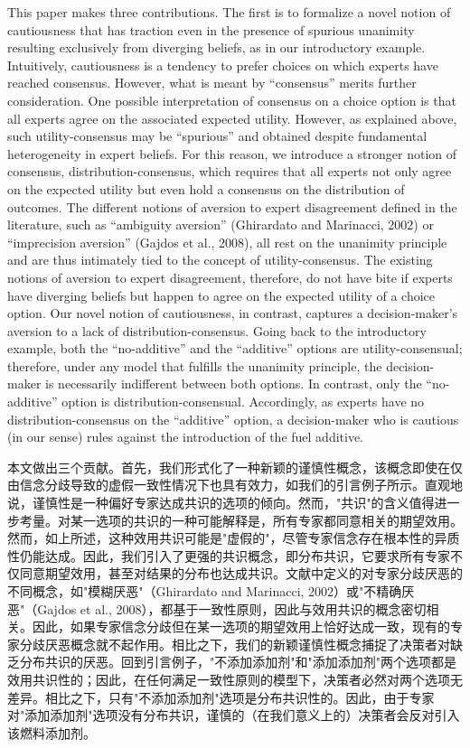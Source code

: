 \documentclass[12pt,a4paper]{article}
\newenvironment{original}
  {\par\noindent\ignorespaces}
  {\par}
\newenvironment{translation}
  {\par\noindent{\color{transblue}\ignorespaces}}
  {\par\medskip}
\begin{document}
\begin{original}
This paper makes three contributions. The first is to formalize a novel notion of cautiousness that has traction even in the presence of spurious unanimity resulting exclusively from diverging beliefs, as in our introductory example. Intuitively, cautiousness is a tendency to prefer choices on which experts have reached consensus. However, what is meant by ``consensus'' merits further consideration. One possible interpretation of consensus on a choice option is that all experts agree on the associated expected utility. However, as explained above, such utility-consensus may be ``spurious'' and obtained despite fundamental heterogeneity in expert beliefs. For this reason, we introduce a stronger notion of consensus, distribution-consensus, which requires that all experts not only agree on the expected utility but even hold a consensus on the distribution of outcomes. The different notions of aversion to expert disagreement defined in the literature, such as ``ambiguity aversion'' (Ghirardato and Marinacci, 2002) or ``imprecision aversion'' (Gajdos et al., 2008), all rest on the unanimity principle and are thus intimately tied to the concept of utility-consensus. The existing notions of aversion to expert disagreement, therefore, do not have bite if experts have diverging beliefs but happen to agree on the expected utility of a choice option. Our novel notion of cautiousness, in contrast, captures a decision-maker's aversion to a lack of distribution-consensus. Going back to the introductory example, both the ``no-additive'' and the ``additive'' options are utility-consensual; therefore, under any model that fulfills the unanimity principle, the decision-maker is necessarily indifferent between both options. In contrast, only the ``no-additive'' option is distribution-consensual. Accordingly, as experts have no distribution-consensus on the ``additive'' option, a decision-maker who is cautious (in our sense) rules against the introduction of the fuel additive.
\end{original}

\begin{translation}
本文做出三个贡献。首先，我们形式化了一种新颖的谨慎性概念，该概念即使在仅由信念分歧导致的虚假一致性情况下也具有效力，如我们的引言例子所示。直观地说，谨慎性是一种偏好专家达成共识的选项的倾向。然而，"共识"的含义值得进一步考量。对某一选项的共识的一种可能解释是，所有专家都同意相关的期望效用。然而，如上所述，这种效用共识可能是"虚假的"，尽管专家信念存在根本性的异质性仍能达成。因此，我们引入了更强的共识概念，即分布共识，它要求所有专家不仅同意期望效用，甚至对结果的分布也达成共识。文献中定义的对专家分歧厌恶的不同概念，如"模糊厌恶"（Ghirardato and Marinacci, 2002）或"不精确厌恶"（Gajdos et al., 2008），都基于一致性原则，因此与效用共识的概念密切相关。因此，如果专家信念分歧但在某一选项的期望效用上恰好达成一致，现有的专家分歧厌恶概念就不起作用。相比之下，我们的新颖谨慎性概念捕捉了决策者对缺乏分布共识的厌恶。回到引言例子，"不添加添加剂"和"添加添加剂"两个选项都是效用共识性的；因此，在任何满足一致性原则的模型下，决策者必然对两个选项无差异。相比之下，只有"不添加添加剂"选项是分布共识性的。因此，由于专家对"添加添加剂"选项没有分布共识，谨慎的（在我们意义上的）决策者会反对引入该燃料添加剂。
\end{translation}
\end{document}
